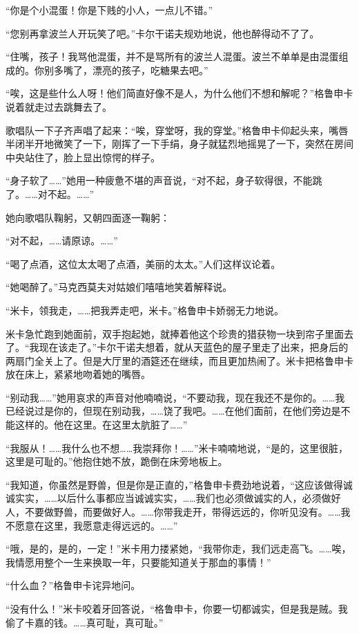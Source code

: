 \par “你是个小混蛋！你是下贱的小人，一点儿不错。”
\par “您别再拿波兰人开玩笑了吧。”卡尔干诺夫规劝地说，他也醉得动不了了。
\par “住嘴，孩子！我骂他混蛋，并不是骂所有的波兰人混蛋。波兰不单单是由混蛋组成的。你别多嘴了，漂亮的孩子，吃糖果去吧。”
\par “唉，这是些什么人呀！他们简直好像不是人，为什么他们不想和解呢？”格鲁申卡说着就走过去跳舞去了。
\par 歌唱队一下子齐声唱了起来：“唉，穿堂呀，我的穿堂。”格鲁申卡仰起头来，嘴唇半闭半开地微笑了一下，刚挥了一下手绢，身子就猛烈地摇晃了一下，突然在房间中央站住了，脸上显出惊愕的样子。
\par “身子软了……”她用一种疲惫不堪的声音说，“对不起，身子软得很，不能跳了。……对不起。……”
\par 她向歌唱队鞠躬，又朝四面逐一鞠躬：
\par “对不起，……请原谅。……”
\par “喝了点酒，这位太太喝了点酒，美丽的太太。”人们这样议论着。
\par “她喝醉了。”马克西莫夫对姑娘们嘻嘻地笑着解释说。
\par “米卡，领我走，……把我弄走吧，米卡。”格鲁申卡娇弱无力地说。
\par 米卡急忙跑到她面前，双手抱起她，就捧着他这个珍贵的猎获物一块到帘子里面去了。“我现在该走了。”卡尔干诺夫想着，就从天蓝色的屋子里走了出来，把身后的两扇门全关上了。但是大厅里的酒筵还在继续，而且更加热闹了。米卡把格鲁申卡放在床上，紧紧地吻着她的嘴唇。
\par “别动我……”她用哀求的声音对他喃喃说，“不要动我，现在我还不是你的。……我已经说过是你的，但现在别动我，……饶了我吧。……在他们面前，在他们旁边是不能这样的。他在这里。在这里太肮脏了……”
\par “我服从！……我什么也不想……我崇拜你！……”米卡喃喃地说，“是的，这里很脏，这里是可耻的。”他抱住她不放，跪倒在床旁地板上。
\par “我知道，你虽然是野兽，但是你是正直的，”格鲁申卡费劲地说着，“这应该做得诚诚实实，……以后什么事都应当诚诚实实，……我们也必须做诚实的人，必须做好人，不要做野兽，而要做好人。……你带我走开，带得远远的，你听见没有。……我不愿意在这里，我愿意走得远远的。……”
\par “哦，是的，是的，一定！”米卡用力搂紧她，“我带你走，我们远走高飞。……唉，我情愿用整个一生来换取一年，只要能知道关于那血的事情！”
\par “什么血？”格鲁申卡诧异地问。
\par “没有什么！”米卡咬着牙回答说，“格鲁申卡，你要一切都诚实，但是我是贼。我偷了卡嘉的钱。……真可耻，真可耻。”
